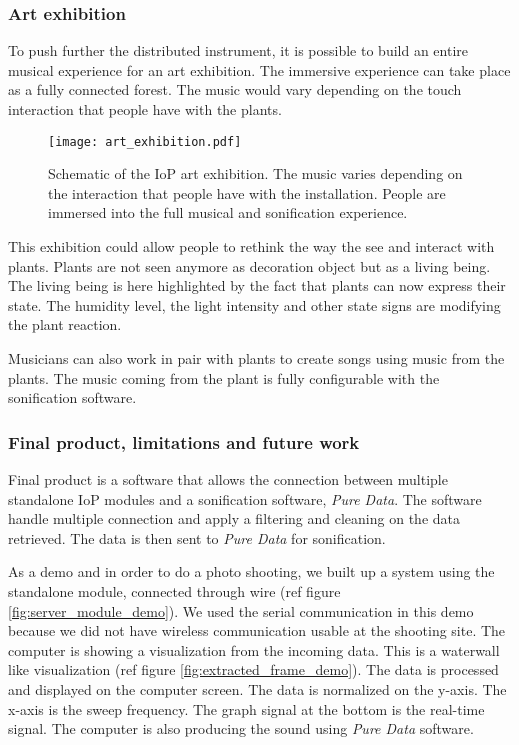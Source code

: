 
\subsubsection{Art exhibition}

To push further the distributed instrument, it is possible to build an entire
musical experience for an art exhibition.
The immersive experience can take place as a fully connected forest. The music would vary
depending on the touch interaction that people have with the plants.

\begin{figure}[h!]
    \centering
    \texttt{[image: art\_exhibition.pdf]}
    \caption{Schematic of the IoP art exhibition. The music varies depending on the
        interaction that people have with the installation. People are immersed into the full
        musical and sonification experience.}
    \vspace{0.1cm}
    \label{fig:art_exhibition}
\end{figure}

This exhibition could allow people to rethink the way the see and interact with plants.
Plants are not seen anymore as decoration object but as a living being.
The living being is here highlighted by the fact that plants can now express their state.
The humidity level, the light intensity and other state signs are modifying the plant
reaction.


Musicians can also work in pair with plants to create songs using music from the plants.
The music coming from the plant is fully configurable with the sonification software.


\subsubsection{Final product, limitations and future work}

Final product is a software that allows the connection between multiple standalone IoP modules and a sonification software, \textit{Pure Data}. The software handle multiple connection and apply a filtering and cleaning on the data
retrieved. The data is then sent to \textit{Pure Data} for sonification.

As a demo and in order to do a photo shooting, we built up a system using the standalone module, connected through wire (ref figure \ref{fig:server_module_demo}). We used the serial communication in this demo because we did not have wireless communication usable at the shooting site. The computer is showing a visualization from the incoming data. This is a waterwall like visualization (ref figure \ref{fig:extracted_frame_demo}). The data is processed and displayed on the computer screen. The data is normalized on the y-axis. The x-axis is the sweep frequency. The graph signal at the bottom is the real-time signal. The computer is also producing the sound using \textit{Pure Data} software.

